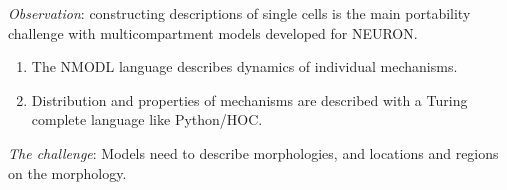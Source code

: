 \documentclass[aspectratio=43]{beamer}
\begin{document}


\begin{frame}[fragile]{}
    \emph{Observation}: constructing descriptions of single cells is the main portability
    challenge with multicompartment models developed for NEURON.

    \vspace{10pt}
    \begin{enumerate}
        \item \textcolor{green!50!black}{} The NMODL language describes dynamics of individual mechanisms.
        \item \textcolor{red}{} Distribution and properties of mechanisms are described with a Turing complete language
              like Python/HOC.
    \end{enumerate}
    \vspace{10pt}
    \emph{The challenge}: Models need to describe morphologies, and locations and regions on the morphology.
\end{frame}
\end{document}
